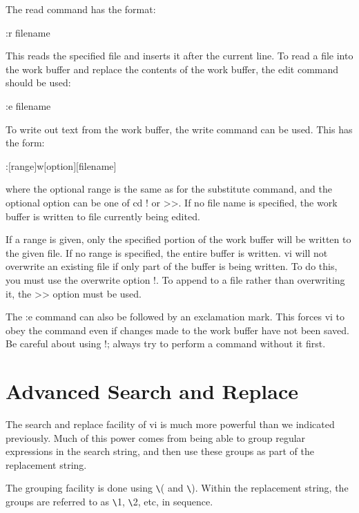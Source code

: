      The read command has the format:
\begin{display}\cd
:r {\ms filename\/}
\end{display}
\noindent
     This reads  the specified  file and inserts it after the current
line. To read a  file into the work buffer and replace the contents
of the work buffer, the edit command should be used:
\begin{display}\cd
:e {\ms filename\/}
\end{display}
\noindent
     To write out text from the work buffer, the write command
can be used.  This has the form:
\begin{display}\cd
:$[${\ms range\/}$]$w$[${\ms option\/}$][${\ms filename\/}$]$
\end{display}
\noindent
     where the optional {\ms range\/} is  the same  as for  the 
substitute command, and the optional {\ms option\/} can be one of {cd
!} or {\cd >>}.   If no file name is specified, the work buffer is
written to file currently being edited.

If  a range is given, only the specified portion of the work buffer
will be written to the given file.  If no range is  specified, the 
entire buffer is written. {\cmd vi} will not overwrite an existing
file  if only  part of the buffer is being written.  To do this, you 
must use  the overwrite  option {\cd !}.  To append  to a file rather
than overwriting it, the {\cd >>} option must be used.

The {\cd :e} command can also be followed by an exclamation  mark.
This  forces {\cmd vi} to obey the command even if changes made to the
work buffer have   not been saved.  Be  careful about using {\cd !}; 
always  try  to perform a command without it first.

\section{Advanced Search and Replace}
The search and replace facility of {\cmd vi} is much more powerful
than we indicated previously. Much of this power comes from being
able to group regular expressions in the search string, and then use
these groups as part of the replacement string.

The grouping facility is done using {\cd \verb+\+(} and {\cd
\verb+\+)}. Within the replacement string, the groups are referred to
as {\cd \verb+\+1}, {\cd \verb+\+2}, etc, in sequence.

